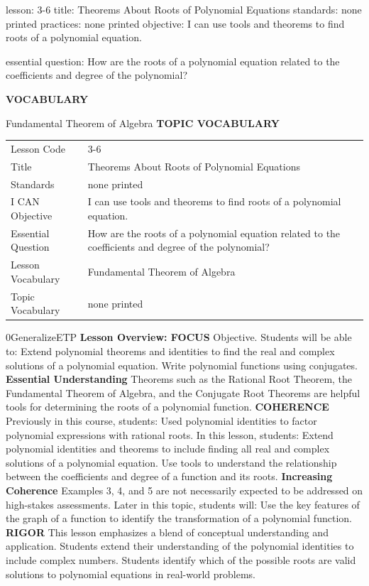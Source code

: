 \documentclass{article}
\newenvironment{lesson-meta}{}{}        %
\newenvironment{te-addendum}[2]{}{}     %
\newcommand{\te}[1]{}                   %
\begin{document}
\begin{lesson-meta}
lesson: 3-6
title: Theorems About Roots of Polynomial Equations
standards: none printed
practices: none printed
objective: I can use tools and theorems to find roots of a polynomial equation.

essential question: How are the roots of a polynomial equation related to the coefficients and degree of the polynomial?

\textbf{VOCABULARY}
\item Fundamental Theorem of Algebra
\textbf{TOPIC VOCABULARY}
\te{No separate topic vocabulary list is printed on these lesson pages.}
\begin{tabular}{ll}
Lesson Code & 3-6 \\
Title & Theorems About Roots of Polynomial Equations \\
Standards & none printed \\
I CAN Objective & I can use tools and theorems to find roots of a polynomial equation. \\
Essential Question & How are the roots of a polynomial equation related to the coefficients and degree of the polynomial? \\
Lesson Vocabulary & Fundamental Theorem of Algebra \\
Topic Vocabulary & none printed \\
\end{tabular}
\end{lesson-meta}
\begin{te-addendum}{0}{GeneralizeETP}
\textbf{Lesson Overview: FOCUS}
Objective. Students will be able to:
Extend polynomial theorems and identities to find the real and complex solutions of a polynomial equation.
Write polynomial functions using conjugates.
\textbf{Essential Understanding}
Theorems such as the Rational Root Theorem, the Fundamental Theorem of Algebra, and the Conjugate Root Theorems are helpful tools for determining the roots of a polynomial function.
\textbf{COHERENCE}
Previously in this course, students:
Used polynomial identities to factor polynomial expressions with rational roots.
In this lesson, students:
Extend polynomial identities and theorems to include finding all real and complex solutions of a polynomial equation.
Use tools to understand the relationship between the coefficients and degree of a function and its roots.
\textbf{Increasing Coherence} Examples 3, 4, and 5 are not necessarily expected to be addressed on high-stakes assessments.
Later in this topic, students will:
Use the key features of the graph of a function to identify the transformation of a polynomial function.
\textbf{RIGOR}
This lesson emphasizes a blend of conceptual understanding and application.
Students extend their understanding of the polynomial identities to include complex numbers.
Students identify which of the possible roots are valid solutions to polynomial equations in real-world problems.
\end{te-addendum}
\end{document}
